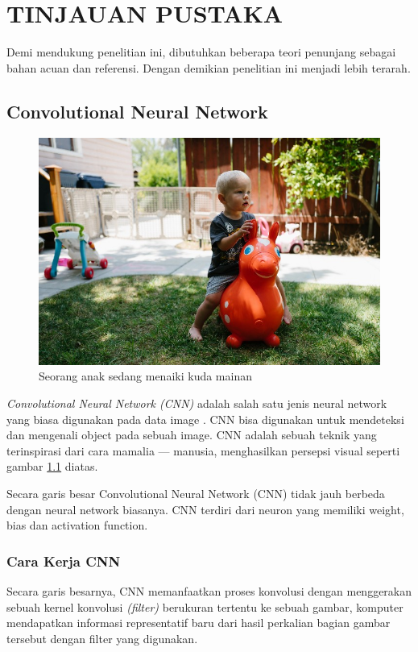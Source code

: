 \chapter{TINJAUAN PUSTAKA}
\label{chap:tinjauanpustaka}


Demi mendukung penelitian ini, dibutuhkan beberapa teori penunjang sebagai bahan acuan dan referensi. Dengan demikian penelitian ini menjadi lebih terarah.

\section{Convolutional Neural Network}
\label{sec:cnn}

\begin{figure}[ht]
	\centering
	
	\includegraphics[width=0.7\columnwidth]{gambar/kuda-kudaan.jpeg}
	
	\caption{Seorang anak sedang menaiki kuda mainan \citep{cit:kuda}}
	\label{fig:kudakudaan}
\end{figure}

\emph{Convolutional Neural Network (CNN)} adalah salah satu jenis neural network yang biasa digunakan pada data image \cite{cit:cnn}. CNN bisa digunakan untuk mendeteksi dan mengenali object pada sebuah image. CNN adalah sebuah teknik yang terinspirasi dari cara mamalia — manusia, menghasilkan persepsi visual seperti gambar \ref{fig:kudakudaan} diatas.

Secara garis besar Convolutional Neural Network (CNN) tidak jauh berbeda dengan neural network biasanya. CNN terdiri dari neuron yang memiliki weight, bias dan activation function.

\subsection{Cara Kerja CNN}
Secara garis besarnya, CNN memanfaatkan proses konvolusi dengan menggerakan sebuah kernel konvolusi \textit{(filter)} berukuran tertentu ke sebuah gambar, komputer mendapatkan informasi representatif baru dari hasil perkalian bagian gambar tersebut dengan filter yang digunakan.

